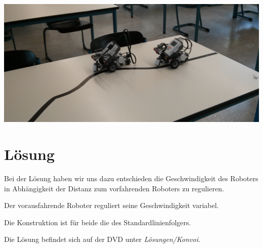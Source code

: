 \begin{capfigure}[Strecke]
	\includegraphics[width=\textwidth]{images/fotokonvoi}
\end{capfigure}
\section{Lösung}
Bei der Lösung haben wir uns dazu entschieden die Geschwindigkeit des Roboters in Abhängigkeit der Distanz zum vorfahrenden Roboters zu regulieren.

Der vorausfahrende Roboter reguliert seine Geschwindigkeit variabel.

Die Konstruktion ist für beide die des Standardlinienfolgers.

Die Lösung befindet sich auf der DVD unter \textit{Lösungen/Konvoi}.